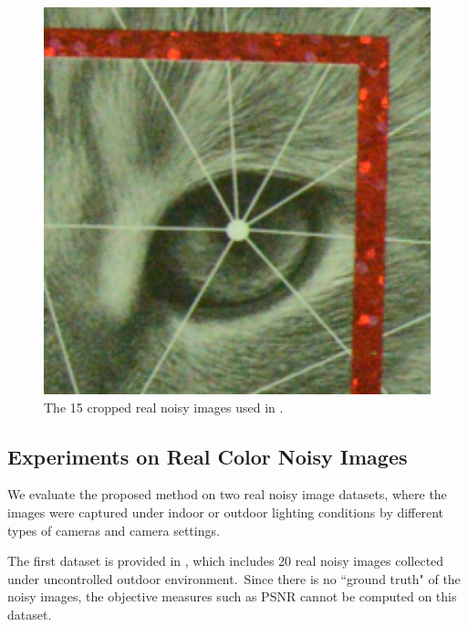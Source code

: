 \documentclass[10pt,twocolumn,letterpaper,sort&compress]{article}
\begin{document}
\begin{figure}
{\begin{minipage}{0.085\textwidth}
\end{minipage}
\begin{minipage}{0.085\textwidth}
\includegraphics[width=1\textwidth]{CC15images/resize_d800_iso6400_3_real.png}
\end{minipage}
}\vspace{-1mm}
\caption{The 15 cropped real noisy images used in \cite{crosschannel2016}.}
\label{f2}
\vspace{-3mm}
\end{figure}

\subsection{Experiments on Real Color Noisy Images}

We evaluate the proposed method on two real noisy image datasets, where the images were captured under indoor or outdoor lighting conditions by different types of cameras and camera settings. 

The first dataset is provided in \cite{ncwebsite}, which includes 20 real noisy images collected under uncontrolled outdoor environment.\ Since there is no ``ground truth" of the noisy images, the objective measures such as PSNR cannot be computed on this dataset. 
\end{document}
